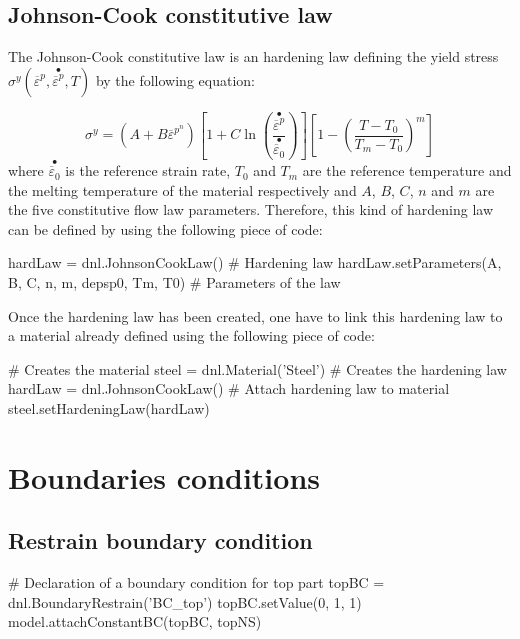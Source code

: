 \subsection{Johnson-Cook constitutive law}

The Johnson-Cook constitutive law is an hardening law defining the yield stress $\sigma^{y}(\overline{\varepsilon}^{p},\stackrel{\bullet}{\overline{\varepsilon}^{p}},T)$ by the following equation:

\begin{equation}
\sigma^{y}=\left(A+B\overline{\varepsilon}^{p^{n}}\right)\left[1+C\ln\left(\frac{\stackrel{\bullet}{\overline{\varepsilon}^{p}}}{\stackrel{\bullet}{\overline{\varepsilon}_{0}}}\right)\right]\left[1-\left(\frac{T-T_{0}}{T_{m}-T_{0}}\right)^{m}\right]
\end{equation}
where $\stackrel{\bullet}{\overline{\varepsilon}_{0}}$ is the reference strain rate, $T_{0}$ and $T_{m}$ are the reference temperature and the melting temperature of the material respectively and $A$, $B$, $C$, $n$ and $m$ are the five constitutive flow law parameters. Therefore, this kind of hardening law can be defined by using the following piece of code:

\begin{PythonListing}
hardLaw = dnl.JohnsonCookLaw()                       # Hardening law
hardLaw.setParameters(A, B, C, n, m, depsp0, Tm, T0) # Parameters of the law
\end{PythonListing}

Once the hardening law has been created, one have to link this hardening law to a material already defined using the following piece of code:

\begin{PythonListing}
# Creates the material
steel = dnl.Material('Steel')
# Creates the hardening law
hardLaw = dnl.JohnsonCookLaw()
# Attach hardening law to material
steel.setHardeningLaw(hardLaw)
\end{PythonListing}

\section{Boundaries conditions}

\subsection{Restrain boundary condition}

\begin{PythonListing}
# Declaration of a boundary condition for top part
topBC = dnl.BoundaryRestrain('BC_top')
topBC.setValue(0, 1, 1)
model.attachConstantBC(topBC, topNS)
\end{PythonListing}

